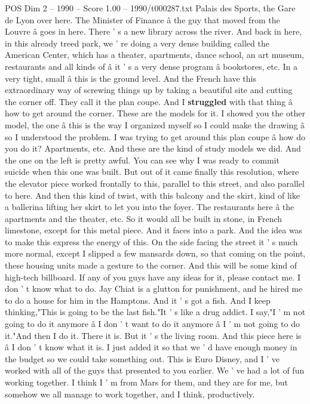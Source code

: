 \begin{textsample}{POS Dim 2 – 1990 – Score 1.00 – 1990/t000287.txt}
Palais des Sports, the Gare de Lyon over here.
The Minister of Finance â the guy that moved from the Louvre â goes in here.
There ' s a new library across the river.
And back in here, in this already treed park, we ' re doing a very dense building called the American Center, which has a theater, apartments, dance school, an art museum, restaurants and all kinds of â it ' s a very dense program â bookstores, etc.
In a very tight, small â this is the ground level.
And the French have this extraordinary way of screwing things up by taking a beautiful site and cutting the corner off.
They call it the plan coupe.
And I \textbf{struggled} with that thing â how to get around the corner.
These are the models for it.
I showed you the other model, the one â this is the way I organized myself so I could make the drawing â so I understood the problem.
I was trying to get around this plan coupe â how do you do it?
Apartments, etc.
And these are the kind of study models we did.
And the one on the left is pretty awful.
You can see why I was ready to commit suicide when this one was built.
But out of it came finally this resolution, where the elevator piece worked frontally to this, parallel to this street, and also parallel to here.
And then this kind of twist, with this balcony and the skirt, kind of like a ballerina lifting her skirt to let you into the foyer.
The restaurants here â the apartments and the theater, etc.
So it would all be built in stone, in French limestone, except for this metal piece.
And it faces into a park.
And the idea was to make this express the energy of this.
On the side facing the street it ' s much more normal, except I slipped a few mansards down, so that coming on the point, these housing units made a gesture to the corner.
And this will be some kind of high-tech billboard.
If any of you guys have any ideas for it, please contact me.
I don ' t know what to do.
Jay Chiat is a glutton for punishment, and he hired me to do a house for him in the Hamptons.
And it ' s got a fish.
And I keep thinking,"This is going to be the last fish."It ' s like a drug addict.
I say,"I ' m not going to do it anymore â I don ' t want to do it anymore â I ' m not going to do it."And then I do it.
There it is.
But it ' s the living room.
And this piece here is â I don ' t know what it is.
I just added it so that we ' d have enough money in the budget so we could take something out.
This is Euro Disney, and I ' ve worked with all of the guys that presented to you earlier.
We ' ve had a lot of fun working together.
I think I ' m from Mars for them, and they are for me, but somehow we all manage to work together, and I think, productively.

\end{textsample}
